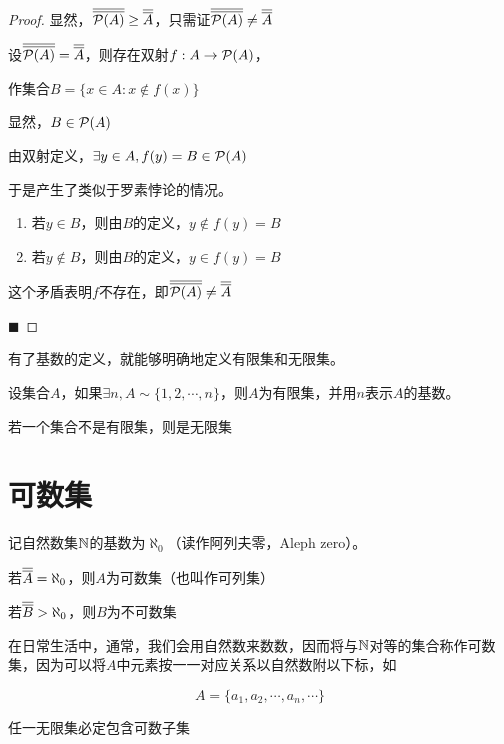 \begin{proof}
    显然，$\overline{\overline{\mathcal{P} (A)}} \geq\overline{\overline{A}}$，只需证$\overline{\overline{\mathcal{P} (A)}} \neq\overline{\overline{A}}$

    设$\overline{\overline{\mathcal{P} (A)}} =\overline{\overline{A}}$，则存在双射$f:A\rightarrow \mathcal{P}(A)$，

    作集合$B=\{x\in A:x\notin f(x) \}$

    显然，$B\in \mathcal{P}(A)$

    由双射定义，$\exists y\in A,f(y) = B \in \mathcal{P}(A)$

    于是产生了类似于罗素悖论的情况。

    \begin{enumerate}
        \item 若$y\in B$，则由$B$的定义，$y\notin f(y) =B$
        \item 若$y\notin B$，则由$B$的定义，$y\in f(y) = B$
    \end{enumerate}

    这个矛盾表明$f$不存在，即$\overline{\overline{\mathcal{P} (A)}} \neq\overline{\overline{A}}$

    $\blacksquare$

\end{proof}

有了基数的定义，就能够明确地定义有限集和无限集。

\begin{definition}[有限集和无限集]
    设集合$A$，如果$\exists n,A\sim \{1,2,\cdots,n\}$，则$A$为有限集，并用$n$表示$A$的基数。

    若一个集合不是有限集，则是无限集
\end{definition}

\section{可数集}

\begin{definition}[可数集]
    记自然数集$\mathbb{N}$的基数为$\aleph_0  $（读作阿列夫零，Aleph zero）。
    
    若$\overline{\overline{A}} = \aleph_0$，则$A$为可数集（也叫作可列集）

    若$\overline{\overline{B}}>\aleph_0$，则$B$为不可数集
\end{definition}

在日常生活中，通常，我们会用自然数来数数，因而将与$\mathbb{N}$对等的集合称作可数集，因为可以将$A$中元素按一一对应关系以自然数附以下标，如

\[A=\{a_1,a_2,\cdots,a_n,\cdots \}\]

\begin{theorem}
    \label{th:aleph0IsMin}
    任一无限集必定包含可数子集
\end{theorem}

